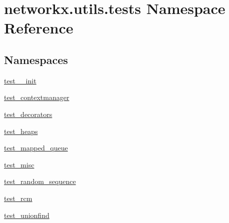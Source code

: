 \hypertarget{namespacenetworkx_1_1utils_1_1tests}{}\section{networkx.\+utils.\+tests Namespace Reference}
\label{namespacenetworkx_1_1utils_1_1tests}
\subsection*{Namespaces}
\begin{DoxyCompactItemize}
\item 
 \hyperlink{namespacenetworkx_1_1utils_1_1tests_1_1test____init}{test\+\_\+\+\_\+init}
\item 
 \hyperlink{namespacenetworkx_1_1utils_1_1tests_1_1test__contextmanager}{test\+\_\+contextmanager}
\item 
 \hyperlink{namespacenetworkx_1_1utils_1_1tests_1_1test__decorators}{test\+\_\+decorators}
\item 
 \hyperlink{namespacenetworkx_1_1utils_1_1tests_1_1test__heaps}{test\+\_\+heaps}
\item 
 \hyperlink{namespacenetworkx_1_1utils_1_1tests_1_1test__mapped__queue}{test\+\_\+mapped\+\_\+queue}
\item 
 \hyperlink{namespacenetworkx_1_1utils_1_1tests_1_1test__misc}{test\+\_\+misc}
\item 
 \hyperlink{namespacenetworkx_1_1utils_1_1tests_1_1test__random__sequence}{test\+\_\+random\+\_\+sequence}
\item 
 \hyperlink{namespacenetworkx_1_1utils_1_1tests_1_1test__rcm}{test\+\_\+rcm}
\item 
 \hyperlink{namespacenetworkx_1_1utils_1_1tests_1_1test__unionfind}{test\+\_\+unionfind}
\end{DoxyCompactItemize}
